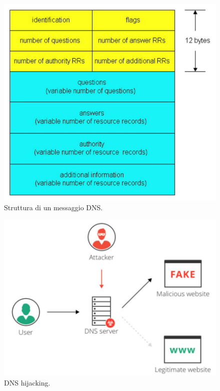 \documentclass[11pt, italian, openany]{book}
\begin{document}
\begin{sloppypar}
\begin{figure}[!h]
	\centering
	\includegraphics[scale=0.5]{images/dns-messaggio.png}
	\caption{Struttura di un messaggio DNS.}
	\label{fig:dns-messaggio}
\end{figure}
\begin{figure}[!h]
	\centering
	\includegraphics[scale=0.35]{images/dns-hijacking.png}
	\caption{DNS hijacking.}
	\label{fig:dns-hijacking}
\end{figure}



\end{sloppypar}
\end{document}
